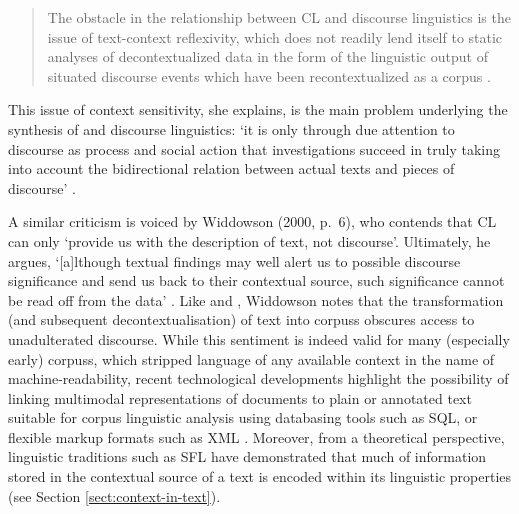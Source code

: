 \begin{quote}\singlespacing\small
The obstacle in the relationship between \gls{CL} and discourse linguistics is the issue of text-context reflexivity, which does not readily lend itself to static analyses of decontextualized data in the form of the linguistic output of situated discourse events which have been recontextualized as a \gls{corpus} \parencite*[p.~60]{virtanen_discourse_2009}.
\end{quote}
%
This issue of context sensitivity, she explains, is the main problem underlying the synthesis of  and discourse linguistics: `it is only through due attention to discourse as process and social action that investigations succeed in truly taking into account the bidirectional relation between actual texts and pieces of discourse' \parencite*[p.~62]{virtanen_discourse_2009}.

A similar criticism is voiced by Widdowson (2000, p.~6), who contends that \gls{CL} can only `provide us with the description of text, not discourse'. Ultimately, he argues, `[a]lthough textual findings may well alert us to possible discourse significance and send us back to their contextual source, such significance cannot be read off from the data' \parencite*[p.~9.]{widdowson_limitations_2000}. Like \textcite{virtanen_discourse_2009} and \textcite{mautner_time_2005}, Widdowson notes that the transformation (and subsequent decontextualisation) of text into \glspl{corpus} obscures access to unadulterated discourse. While this sentiment is indeed valid for many (especially early) \glspl{corpus}, which stripped language of any available context in the name of machine\hyp{}readability, recent technological developments highlight the possibility of linking multimodal representations of documents to plain or annotated text suitable for corpus linguistic analysis 
using databasing tools such as SQL, or flexible markup formats such as \gls{XML} \cite{hiippala2016}. Moreover, from a theoretical perspective, linguistic traditions such as \gls{SFL} have demonstrated that much of information stored in the contextual source of a text is encoded within its linguistic properties (see Section \ref{sect:context-in-text}).



